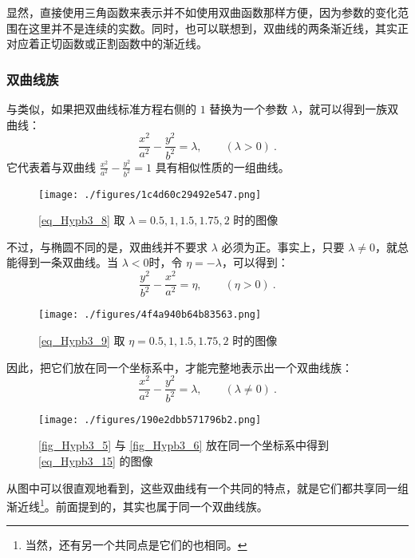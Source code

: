 显然，直接使用三角函数来表示并不如使用双曲函数那样方便，因为参数的变化范围在这里并不是连续的实数。同时，也可以联想到，双曲线的两条渐近线，其实正对应着正切函数或正割函数中的渐近线。

\subsubsection{双曲线族}

与类似，如果把双曲线标准方程右侧的 $1$ 替换为一个参数 $\lambda$，就可以得到一族双曲线：
\begin{equation}\label{eq_Hypb3_8}
\frac{x^2}{a^2} - \frac{y^2}{b^2} = \lambda,\qquad(\lambda>0)~.
\end{equation}
它代表着与双曲线 $\displaystyle\frac{x^2}{a^2} - \frac{y^2}{b^2} = 1$ 具有相似性质的一组曲线。

\begin{figure}[ht]
\centering
\texttt{[image: ./figures/1c4d60c29492e547.png]}
\caption{\autoref{eq_Hypb3_8} 取 $\lambda=0.5,1,1.5,1.75,2$ 时的图像} \label{fig_Hypb3_5}
\end{figure}

不过，与椭圆不同的是，双曲线并不要求 $\lambda$ 必须为正。事实上，只要 $\lambda\neq0$，就总能得到一条双曲线。当 $\lambda<0$时，令 $\eta=-\lambda$，可以得到：
\begin{equation}\label{eq_Hypb3_9}
\frac{y^2}{b^2}-\frac{x^2}{a^2} = \eta,\qquad(\eta>0)~.
\end{equation}

\begin{figure}[ht]
\centering
\texttt{[image: ./figures/4f4a940b64b83563.png]}
\caption{\autoref{eq_Hypb3_9} 取 $\eta=0.5,1,1.5,1.75,2$ 时的图像} \label{fig_Hypb3_6}
\end{figure}

因此，把它们放在同一个坐标系中，才能完整地表示出一个双曲线族：
\begin{equation}\label{eq_Hypb3_15}
\frac{x^2}{a^2} - \frac{y^2}{b^2} = \lambda,\qquad(\lambda\neq0)~.
\end{equation}

\begin{figure}[ht]
\centering
\texttt{[image: ./figures/190e2dbb571796b2.png]}
\caption{\autoref{fig_Hypb3_5} 与 \autoref{fig_Hypb3_6} 放在同一个坐标系中得到 \autoref{eq_Hypb3_15} 的图像} \label{fig_Hypb3_7}
\end{figure}

从图中可以很直观地看到，这些双曲线有一个共同的特点，就是它们都共享同一组渐近线\footnote{当然，还有另一个共同点是它们的也相同。}。前面提到的，其实也属于同一个双曲线族。

